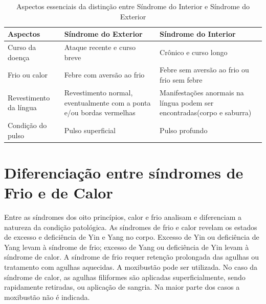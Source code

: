 \documentclass[12pt,oneside,a4paper]{book} %
\begin{document}
\begin{table}[!h]

\centering
{\renewcommand\arraystretch{1.25}
	\caption{ Aspectos essenciais da distinção entre Síndrome do Interior e Síndrome do Exterior}}
	\vspace{0.5cm}
	\begin{tabular}{l p{5.5cm} p{5.5cm}}
	
		\hline
		
		 Aspectos &  
		 Síndrome do Exterior &
		 Síndrome do Interior				
		\\ \hline \hline
		  
		Curso da doença &
		Ataque recente e curso breve &
		 Crônico e curso longo
		\\  
		  
		Frio ou calor &
		Febre com aversão ao frio &
	    Febre sem aversão ao frio ou frio sem febre
		\\  
		  
		 Revestimento da língua &
		Revestimento normal, eventualmente com a ponta e/ou bordas vermelhas &
		Manifestações anormais na língua podem ser encontradas(corpo e saburra)
		\\  
		  
		Condição do pulso &
		Pulso superficial &
		{Pulso profundo}
		\\  
		\hline
		
  \end{tabular} 


\end{table} 


\section{Diferenciação entre síndromes de Frio e de Calor}

Entre as síndromes dos oito princípios, calor e frio analisam e diferenciam a natureza da condição patológica. As síndromes de frio e calor revelam os estados de excesso e deficiência de Yin e Yang no corpo. Excesso de Yin ou deficiência de Yang levam à síndrome de frio; excesso de Yang ou deficiência de Yin levam à síndrome de calor. 
A síndrome de frio requer retenção prolongada das agulhas ou tratamento com agulhas aquecidas. A moxibustão pode ser utilizada. 
No caso da síndrome de calor, as agulhas filiformes são aplicadas superficialmente, sendo rapidamente retiradas, ou aplicação de sangria. Na maior parte dos casos a moxibustão não é indicada.
\end{document}
